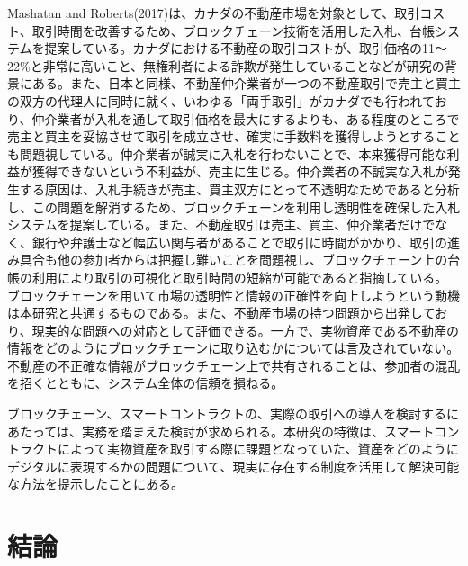\documentclass[a4paper,fontsize=11pt,report,notitlepage,line_length=38zw,number_of_lines=40,dvipdfmx]{jlreq}
\begin{document}
Mashatan and Roberts(2017)\cite{mashatan2017}は、カナダの不動産市場を対象として、取引コスト、取引時間を改善するため、ブロックチェーン技術を活用した入札、台帳システムを提案している。カナダにおける不動産の取引コストが、取引価格の11〜22\%と非常に高いこと、無権利者による詐欺が発生していることなどが研究の背景にある。また、日本と同様、不動産仲介業者が一つの不動産取引で売主と買主の双方の代理人に同時に就く、いわゆる「両手取引」がカナダでも行われており、仲介業者が入札を通して取引価格を最大にするよりも、ある程度のところで売主と買主を妥協させて取引を成立させ、確実に手数料を獲得しようとすることも問題視している。仲介業者が誠実に入札を行わないことで、本来獲得可能な利益が獲得できないという不利益が、売主に生じる。仲介業者の不誠実な入札が発生する原因は、入札手続きが売主、買主双方にとって不透明なためであると分析し、この問題を解消するため、ブロックチェーンを利用し透明性を確保した入札システムを提案している。また、不動産取引は売主、買主、仲介業者だけでなく、銀行や弁護士など幅広い関与者があることで取引に時間がかかり、取引の進み具合も他の参加者からは把握し難いことを問題視し、ブロックチェーン上の台帳の利用により取引の可視化と取引時間の短縮が可能であると指摘している。
ブロックチェーンを用いて市場の透明性と情報の正確性を向上しようという動機は本研究と共通するものである。また、不動産市場の持つ問題から出発しており、現実的な問題への対応として評価できる。一方で、実物資産である不動産の情報をどのようにブロックチェーンに取り込むかについては言及されていない。不動産の不正確な情報がブロックチェーン上で共有されることは、参加者の混乱を招くとともに、システム全体の信頼を損ねる。


ブロックチェーン、スマートコントラクトの、実際の取引への導入を検討するにあたっては、実務を踏まえた検討が求められる。本研究の特徴は、スマートコントラクトによって実物資産を取引する際に課題となっていた、資産をどのようにデジタルに表現するかの問題について、現実に存在する制度を活用して解決可能な方法を提示したことにある。


\chapter{結論}
\end{document}
